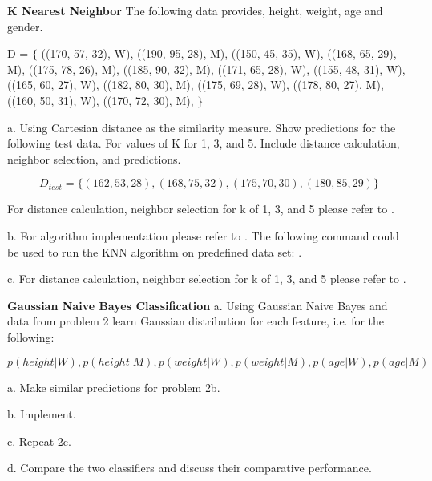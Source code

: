 \documentclass{homeworg}
\begin{document}
\textbf{K Nearest Neighbor}
\newline
The following data provides, height, weight, age and gender.

D = $\{$ \newline
((170, 57, 32), W), \newline
 ((190, 95, 28), M), \newline
 ((150, 45, 35), W), \newline
 ((168, 65, 29), M), \newline
 ((175, 78, 26), M), \newline
 ((185, 90, 32), M), \newline
 ((171, 65, 28), W), \newline
 ((155, 48, 31), W), \newline
 ((165, 60, 27), W), \newline
 ((182, 80, 30), M), \newline
 ((175, 69, 28), W), \newline
 ((178, 80, 27), M), \newline
 ((160, 50, 31), W), \newline
 ((170, 72, 30), M), \newline
$\}$

a. Using Cartesian distance as the similarity measure. Show predictions for the
following test data. For values of K for 1, 3, and 5. Include distance calculation,
neighbor selection, and predictions.

$$
D_{test} = \{(162, 53, 28), (168, 75, 32), (175, 70, 30), (180, 85, 29) \}
$$

For distance calculation, neighbor selection for k of 1, 3, and 5 please refer
to \textbf{}.
\newline

b. For algorithm implementation please refer to \textbf{}.
The following command could be used to run the KNN algorithm on predefined data
set:  \textbf{} \textbf{}.
\newline

c. For distance calculation, neighbor selection for k of 1, 3, and 5 please refer
to \textbf{}.
\newline

\newpage

\exercise*
\textbf{Gaussian Naive Bayes Classification}
\newline
a. Using Gaussian Naive Bayes and data from problem 2 learn Gaussian distribution
for each feature, i.e. for the following:

$$
p(height|W ), p(height|M ), p(weight|W ),
p(weight|M ), p(age|W ), p(age|M )
$$

a. Make similar predictions for problem 2b.

b. Implement.

c. Repeat 2c.

d. Compare the two classifiers and discuss their comparative performance. 
\end{document}
